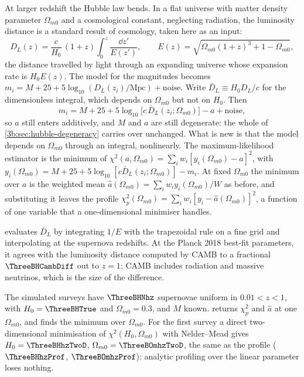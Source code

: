 At larger redshift the Hubble law bends. In a flat universe with matter
density parameter $\Omega_{m0}$ and a cosmological constant, neglecting
radiation, the luminosity distance is a standard result of cosmology,
taken here as an input:
\begin{equation}
  D_L(z)=\frac{c}{H_0}\,(1+z)\int_0^z\frac{\dd z'}{E(z')},
  \qquad
  E(z)=\sqrt{\Omega_{m0}(1+z)^3+1-\Omega_{m0}} ,
  \label{3b:eq:dl}
\end{equation}
the distance travelled by light through an expanding universe whose
expansion rate is $H_0E(z)$. The model for the magnitudes becomes
$m_i=M+25+5\log_{10}(D_L(z_i)/\text{Mpc})+\text{noise}$. Write
$\bar D_L\equiv H_0D_L/c$ for the dimensionless integral, which depends on
$\Omega_{m0}$ but not on $H_0$. Then
\begin{equation}
  m_i=M+25+5\log_{10}\bigl[c\,\bar D_L(z_i;\Omega_{m0})\bigr]-a+\text{noise},
  \label{3b:eq:sn-model-dl}
\end{equation}
so $a$ still enters additively, and $M$ and $a$ are still degenerate: the
whole of \cref{3b:sec:hubble-degeneracy} carries over unchanged. What is new
is that the model depends on $\Omega_{m0}$ through an integral, nonlinearly.
The maximum-likelihood estimator is the minimum of
$\chi^2(a,\Omega_{m0})=\sum_iw_i[y_i(\Omega_{m0})-a]^2$, with
$y_i(\Omega_{m0})=M+25+5\log_{10}[c\bar D_L(z_i;\Omega_{m0})]-m_i$. At fixed
$\Omega_{m0}$ the minimum over $a$ is the weighted mean
$\hat a(\Omega_{m0})=\sum_iw_iy_i(\Omega_{m0})/W$ as before, and substituting
it leaves the profile $\chi^2_p(\Omega_{m0})=\sum_iw_i[y_i-\hat a(\Omega_{m0})]^2$,
a function of one variable that a one-dimensional minimiser handles.

 evaluates $\bar D_L$ by integrating $1/E$ with the trapezoidal
rule on a fine grid and interpolating at the supernova redshifts. At the
Planck 2018 best-fit parameters, it agrees with the luminosity
distance computed by CAMB to a fractional $\ThreeBHCambDiff$ out to $z=1$; CAMB
includes radiation and massive neutrinos, which is the size of the
difference.

The simulated surveys have $\ThreeBHNhz$ supernovae uniform in
$0.01<z<1$, with $H_0=\ThreeBHTrue$ and $\Omega_{m0}=0.3$, and $M$ known.
 returns $\chi^2_p$ and $\hat a$ at one
$\Omega_{m0}$, and  finds the minimum over
$\Omega_{m0}$. For the first survey a direct two-dimensional minimisation of
$\chi^2(H_0,\Omega_{m0})$ with Nelder--Mead gives $H_0=\ThreeBHhzTwoD$,
$\Omega_{m0}=\ThreeBOmhzTwoD$, the same as the profile ($\ThreeBHhzProf$,
$\ThreeBOmhzProf$): analytic profiling over the linear parameter loses nothing.


